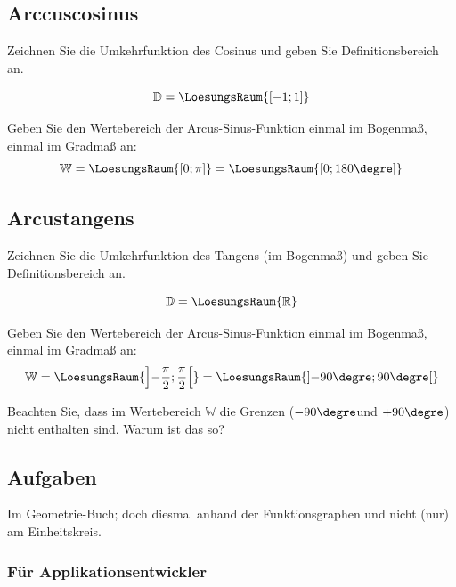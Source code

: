 

\newpage

\subsection{Arccuscosinus}
Zeichnen Sie die Umkehrfunktion des Cosinus und geben Sie Definitionsbereich an.



$$\mathbb{D} = \LoesungsRaum{[-1; 1]}$$

Geben Sie den Wertebereich der Arcus-Sinus-Funktion einmal im Bogenmaß,
einmal im Gradmaß an:
$$\mathbb{W} = \LoesungsRaum{[0; \pi]}  =  \LoesungsRaum{[0; 180\degre]}$$




\newpage


\subsection{Arcustangens}
Zeichnen Sie die Umkehrfunktion des Tangens (im Bogenmaß) und geben Sie Definitionsbereich an.



$$\mathbb{D} = \LoesungsRaum{\mathbb{R}}$$

Geben Sie den Wertebereich der Arcus-Sinus-Funktion einmal im Bogenmaß,
einmal im Gradmaß an:
$$\mathbb{W} = \LoesungsRaum{\left]-\frac{\pi}{2}; \frac{\pi}{2}\right[}  =
\LoesungsRaum{\left]-90\degre; 90\degre\right[}$$

Beachten Sie, dass im Wertebereich $\mathbb{W}$ die Grenzen ($-90\degre$und $+90\degre$) nicht enthalten sind. Warum ist das so?

\subsection*{Aufgaben}
Im Geometrie-Buch; doch diesmal anhand der Funktionsgraphen und nicht (nur) am Einheitskreis.


\newpage


\subsubsection{Für Applikationsentwickler}

